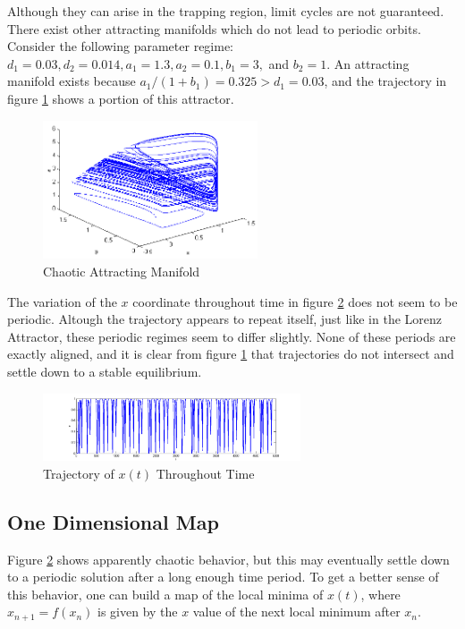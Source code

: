 \documentclass[12pt,journal,compsoc,twoside]{IEEEtran}
\begin{document}
Although they can arise in the trapping region, limit cycles are not guaranteed. There exist other attracting manifolds which do not lead to periodic orbits. Consider the following parameter regime: $d_1 = 0.03, d_2 = 0.014, a_1 = 1.3, a_2 = 0.1, b_1 = 3,$ and $b_2 = 1$. An attracting manifold exists because $a_1 / (1 + b_1) = 0.325 > d_1 = 0.03$, and the trajectory in figure \ref{chaoscycle} shows a portion of this attractor. 

\begin{figure}[h!]
\centering
\includegraphics[width=2.5in, trim = 10 20 10 20]{chaoscycle.png}
\caption{Chaotic Attracting Manifold}
\label{chaoscycle}
\end{figure}

The variation of the $x$ coordinate throughout time in figure \ref{chaosxt} does not seem to be periodic. Altough the trajectory appears to repeat itself, just like in the Lorenz Attractor, these periodic regimes seem to differ slightly. None of these periods are exactly aligned, and it is clear from figure \ref{chaoscycle} that trajectories do not intersect and settle down to a stable equilibrium.

\begin{figure}[h!]
\centering
\includegraphics[width = 3in, trim = 10 20 10 20]{chaosxt.png}
\caption{Trajectory of $x(t)$ Throughout Time}
\label{chaosxt}
\end{figure}

\subsection{One Dimensional Map}

Figure \ref{chaosxt} shows apparently chaotic behavior, but this may eventually settle down to a periodic solution after a long enough time period. To get a better sense of this behavior, one can build a map of the local minima of $x(t)$, where $x_{n+1} = f(x_n)$ is given by the $x$ value of the next local minimum after $x_n$. 
\end{document}
